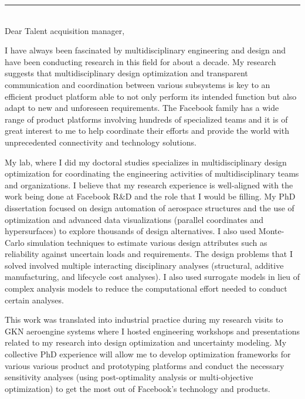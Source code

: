 \documentclass[12pt]{article} %
\begin{document}
\medskip %
\rule[0pt]{\textwidth}{1pt}\\

Dear Talent acquisition manager,

\medskip %
I have always been fascinated by multidisciplinary engineering and design and have been conducting research in this field for about a decade. My research suggests that multidisciplinary design optimization and transparent communication and coordination between various subsystems is key to an efficient product platform able to not only perform its intended function but also adapt to new and unforeseen requirements. The Facebook family has a wide range of product platforms involving hundreds of specialized teams and it is of great interest to me to help coordinate their efforts and provide the world with unprecedented connectivity and technology solutions.

\medskip %

My lab, where I did my doctoral studies specializes in multidisciplinary design optimization for coordinating the engineering activities of multidisciplinary teams and organizations. I believe that my research experience is well-aligned with the work being done at Facebook R\&D and the role that I would be filling. My PhD dissertation focused on design automation of aerospace structures and the use of optimization and advanced data visualizations (parallel coordinates and hypersurfaces) to explore thousands of design alternatives. I also used Monte-Carlo simulation techniques to estimate various design attributes such as reliability against uncertain loads and requirements. The design problems that I solved involved multiple interacting disciplinary analyses (structural, additive manufacturing, and lifecycle cost analyses). I also used surrogate models in lieu of complex analysis models to reduce the computational effort needed to conduct certain analyses.

\medskip %

This work was translated into industrial practice during my research visits to GKN aeroengine systems where I hosted engineering workshops and presentations related to my research into design optimization and uncertainty modeling. My collective PhD experience will allow me to develop optimization frameworks for various various product and prototyping platforms and conduct the necessary sensitivity analyses (using post-optimality analysis or multi-objective optimization) to get the most out of Facebook's technology and products.
\end{document}
